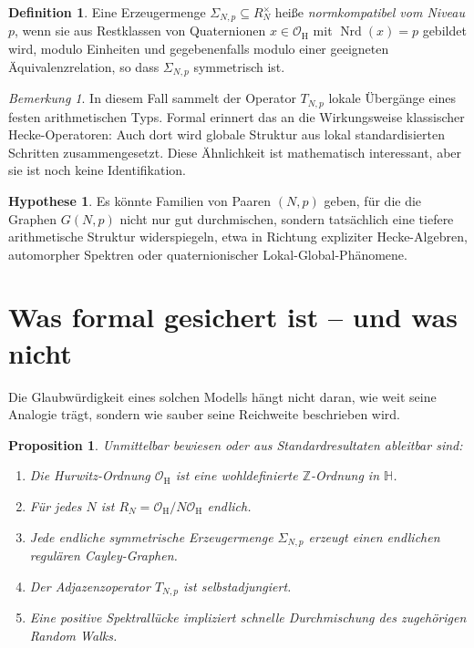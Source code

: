 \documentclass[12pt,a4paper]{article}
\theoremstyle{plain}
\newtheorem{proposition}[satz]{Proposition}
\theoremstyle{definition}
\newtheorem{definition}[satz]{Definition}
\newtheorem{hypothese}[satz]{Hypothese}
\theoremstyle{remark}
\newtheorem{bemerkung}[satz]{Bemerkung}
\newcommand{\Z}{\mathbb{Z}}
\newcommand{\HH}{\mathbb{H}}
\newcommand{\OH}{\mathcal{O}_{\mathrm H}}
\newcommand{\RN}{R_N}
\newcommand{\SNp}{\Sigma_{N,p}}
\newcommand{\GNp}{G(N,p)}
\newcommand{\TNp}{T_{N,p}}
\begin{document}
\begin{definition}
Eine Erzeugermenge \(\SNp\subseteq \RN^\times\) heiße \emph{normkompatibel vom Niveau \(p\)}, wenn sie aus Restklassen von Quaternionen \(x\in\OH\) mit \(\operatorname{Nrd}(x)=p\) gebildet wird, modulo Einheiten und gegebenenfalls modulo einer geeigneten Äquivalenzrelation, so dass \(\SNp\) symmetrisch ist.
\end{definition}

\begin{bemerkung}
In diesem Fall sammelt der Operator \(\TNp\) lokale Übergänge eines festen arithmetischen Typs. Formal erinnert das an die Wirkungsweise klassischer Hecke-Operatoren: Auch dort wird globale Struktur aus lokal standardisierten Schritten zusammengesetzt. Diese Ähnlichkeit ist mathematisch interessant, aber sie ist noch keine Identifikation.
\end{bemerkung}

\begin{hypothese}
Es könnte Familien von Paaren \((N,p)\) geben, für die die Graphen \(\GNp\) nicht nur gut durchmischen, sondern tatsächlich eine tiefere arithmetische Struktur widerspiegeln, etwa in Richtung expliziter Hecke-Algebren, automorpher Spektren oder quaternionischer Lokal-Global-Phänomene.
\end{hypothese}

\section{Was formal gesichert ist -- und was nicht}
Die Glaubwürdigkeit eines solchen Modells hängt nicht daran, wie weit seine Analogie trägt, sondern wie sauber seine Reichweite beschrieben wird.

\begin{proposition}
Unmittelbar bewiesen oder aus Standardresultaten ableitbar sind:
\begin{enumerate}[label=\arabic*.]
\item Die Hurwitz-Ordnung \(\OH\) ist eine wohldefinierte \(\Z\)-Ordnung in \(\HH\).
\item Für jedes \(N\) ist \(\RN=\OH/N\OH\) endlich.
\item Jede endliche symmetrische Erzeugermenge \(\SNp\) erzeugt einen endlichen regulären Cayley-Graphen.
\item Der Adjazenzoperator \(\TNp\) ist selbstadjungiert.
\item Eine positive Spektrallücke impliziert schnelle Durchmischung des zugehörigen Random Walks.
\end{enumerate}
\end{proposition}
\end{document}
